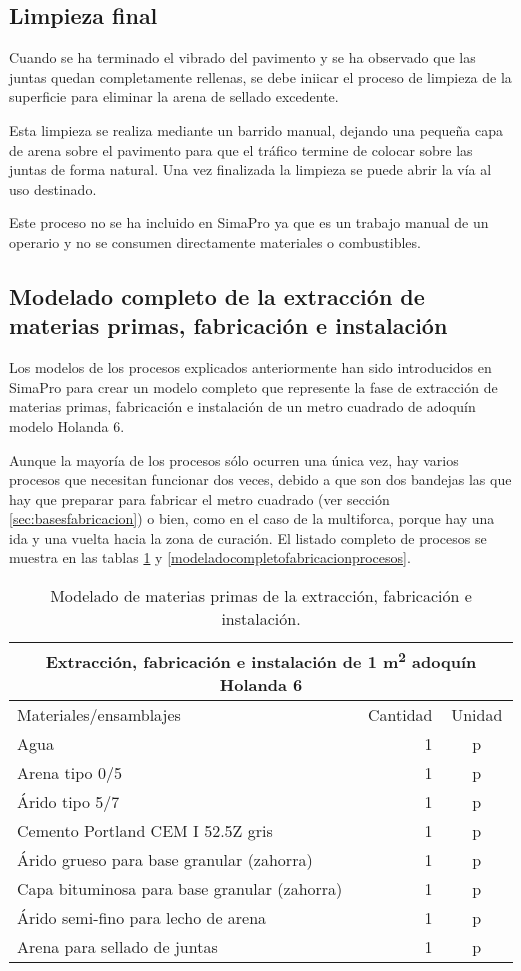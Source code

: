 \subsection{Limpieza final}

Cuando se ha terminado el vibrado del pavimento y se ha observado que las juntas quedan completamente rellenas, se debe iniicar el proceso de limpieza de la superficie para eliminar la arena de sellado excedente.

Esta limpieza se realiza mediante un barrido manual, dejando una pequeña capa de arena sobre el pavimento para que el tráfico termine de colocar sobre las juntas de forma natural. Una vez finalizada la limpieza se puede abrir la vía al uso destinado.

Este proceso no se ha incluido en SimaPro ya que es un trabajo manual de un operario y no se consumen directamente materiales o combustibles.

\subsection{Modelado completo de la extracción de materias primas, fabricación e instalación}\label{sec:modeladofabricacion}

Los modelos de los procesos explicados anteriormente han sido introducidos en SimaPro para crear un modelo completo que represente la fase de extracción de materias primas, fabricación e instalación de un metro cuadrado de adoquín modelo Holanda 6.

Aunque la mayoría de los procesos sólo ocurren una única vez, hay varios procesos que necesitan funcionar dos veces, debido a que son dos bandejas las que hay que preparar para fabricar el metro cuadrado (ver sección \ref{sec:basesfabricacion}) o bien, como en el caso de la multiforca, porque hay una ida y una vuelta hacia la zona de curación. El listado completo de procesos se muestra en las tablas \ref{modeladocompletofabricacionmaterias} y \ref{modeladocompletofabricacionprocesos}.

\begin{table}[!htp]
\centering
\begin{tabular}{p{8cm}rc}
\toprule
\multicolumn{3}{c}{Extracción, fabricación e instalación de 1 \si{m^2} adoquín Holanda 6}\\
\midrule
Materiales/ensamblajes & Cantidad & Unidad\\
\midrule
Agua & 1 & p\\
Arena tipo 0/5 & 1 & p\\
Árido tipo 5/7 & 1 & p\\
Cemento Portland CEM I 52.5Z gris & 1 & p\\
Árido grueso para base granular (zahorra) & 1 & p\\
Capa bituminosa para base granular (zahorra) & 1 & p\\
Árido semi-fino para lecho de arena & 1 & p\\
Arena para sellado de juntas & 1 & p\\
\bottomrule
\end{tabular}
\caption{Modelado de materias primas de la extracción, fabricación e instalación.}
\label{modeladocompletofabricacionmaterias}
\end{table}

